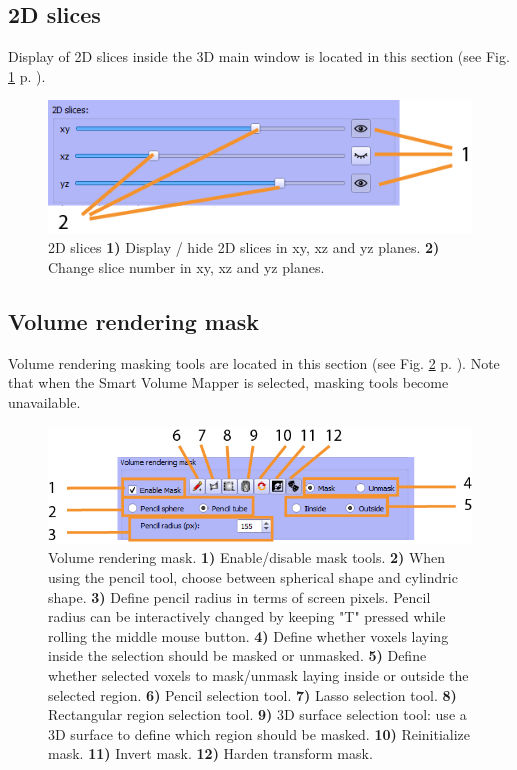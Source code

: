 \subsection{2D slices}
Display of 2D slices inside the 3D main window is located in this section (see Fig. \ref{volume_2Dslices} p. \pageref{volume_2Dslices}).
\begin{figure}
  \centering
  \includegraphics[scale=1]{images/14/volume_2Dslices2.png}
\caption{2D slices  \textbf{1)} Display / hide 2D slices in xy, xz and yz planes. \textbf{2)} Change slice number in xy, xz and yz planes.  }	
\label{volume_2Dslices}

 \end{figure}


\subsection{Volume rendering mask}\label{volume_rendering_masking}
Volume rendering masking tools are located in this section (see Fig. \ref{volume_masking} p. \pageref{volume_masking}). Note that when the Smart Volume Mapper is selected, masking tools become unavailable.
\begin{figure}
  \centering
  \includegraphics[scale=1]{images/14/volume_masking2.png}
\caption{Volume rendering mask.  \textbf{1)} Enable/disable mask tools. \textbf{2)} When using the pencil tool, choose between spherical shape and cylindric shape.  \textbf{3)} Define pencil radius in terms of screen pixels. Pencil radius can be interactively changed by keeping "T" pressed while rolling the middle mouse button.  \textbf{4)} Define whether voxels laying inside the selection should be masked or unmasked. \textbf{5)} Define whether selected voxels to mask/unmask laying inside or outside the selected region. \textbf{6)} Pencil selection tool. \textbf{7)} Lasso selection tool. \textbf{8)} Rectangular region selection tool.  \textbf{9)} 3D surface selection tool: use a 3D surface to define which region should be masked. \textbf{10)} Reinitialize mask. \textbf{11)} Invert mask. \textbf{12)} Harden transform mask.}	
\label{volume_masking}

 \end{figure}


